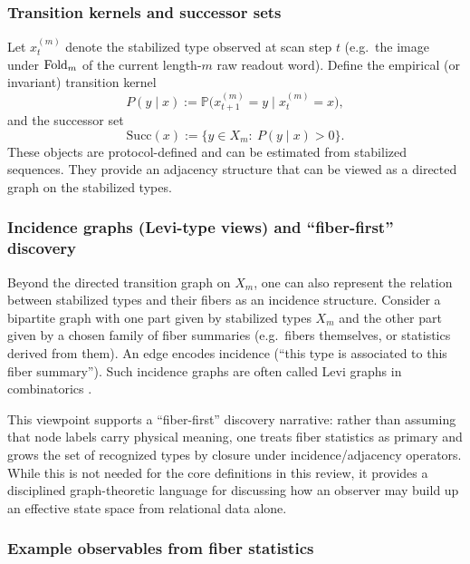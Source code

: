\subsubsection{Transition kernels and successor sets}

Let $x_t^{(m)}$ denote the stabilized type observed at scan step $t$ (e.g.\ the image under $\mathrm{Fold}_m$ of the current length-$m$ raw readout word). Define the empirical (or invariant) transition kernel
\[
P(y\mid x) := \mathbb{P}\bigl(x_{t+1}^{(m)}=y\mid x_t^{(m)}=x\bigr),
\]
and the successor set
\[
\mathrm{Succ}(x):=\{y\in X_m:\ P(y\mid x)>0\}.
\]
These objects are protocol-defined and can be estimated from stabilized sequences. They provide an adjacency structure that can be viewed as a directed graph on the stabilized types.

\subsubsection{Incidence graphs (Levi-type views) and ``fiber-first'' discovery}

Beyond the directed transition graph on $X_m$, one can also represent the relation between stabilized types and their fibers as an incidence structure. Consider a bipartite graph with one part given by stabilized types $X_m$ and the other part given by a chosen family of fiber summaries (e.g.\ fibers themselves, or statistics derived from them). An edge encodes incidence (``this type is associated to this fiber summary''). Such incidence graphs are often called Levi graphs in combinatorics \cite{Diestel2017}.

This viewpoint supports a ``fiber-first'' discovery narrative: rather than assuming that node labels carry physical meaning, one treats fiber statistics as primary and grows the set of recognized types by closure under incidence/adjacency operators. While this is not needed for the core definitions in this review, it provides a disciplined graph-theoretic language for discussing how an observer may build up an effective state space from relational data alone.

\subsubsection{Example observables from fiber statistics}


